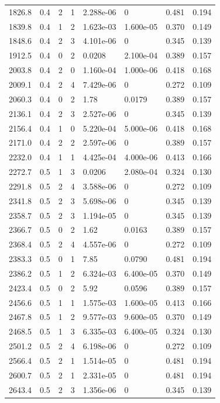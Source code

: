 \documentclass[preview]{standalone}
\begin{document}
{{{\begin{tabular}{L{1.2cm}C{1.2cm} C{0.3cm}C{0.5cm} C{1.4cm}C{1.4cm} C{1.4cm}C{1.4cm}}
  1826.8  &   0.4  & 2     &  1 &  2.288e-06  & 0  & 0.481 &  0.194   \\ 
  1839.8  &   0.4  & 1     &  2 &  1.623e-03  & 1.600e-05  & 0.370 &  0.149   \\ 
  1848.6  &   0.4  & 2     &  3 &  4.101e-06  & 0  & 0.345 &  0.139   \\ 
  1912.5  &   0.4  & 0     &  2 &  0.0208  & 2.100e-04  & 0.389 &  0.157   \\ 
  2003.8  &   0.4  & 2     &  0 &  1.160e-04  & 1.000e-06  & 0.418 &  0.168   \\ 
  2009.1  &   0.4  & 2     &  4 &  7.429e-06  & 0  & 0.272 &  0.109   \\ 
  2060.3  &   0.4  & 0     &  2 &  1.78  & 0.0179  & 0.389 &  0.157   \\ 
  2136.1  &   0.4  & 2     &  3 &  2.527e-06  & 0  & 0.345 &  0.139   \\ 
  2156.4  &   0.4  & 1     &  0 &  5.220e-04  & 5.000e-06  & 0.418 &  0.168   \\ 
  2171.0  &   0.4  & 2     &  2 &  2.597e-06  & 0  & 0.389 &  0.157   \\ 
  2232.0  &   0.4  & 1     &  1 &  4.425e-04  & 4.000e-06  & 0.413 &  0.166   \\ 
  2272.7  &   0.5  & 1     &  3 &  0.0206  & 2.080e-04  & 0.324 &  0.130   \\ 
  2291.8  &   0.5  & 2     &  4 &  3.588e-06  & 0  & 0.272 &  0.109   \\ 
  2341.8  &   0.5  & 2     &  3 &  5.698e-06  & 0  & 0.345 &  0.139   \\ 
  2358.7  &   0.5  & 2     &  3 &  1.194e-05  & 0  & 0.345 &  0.139   \\ 
  2366.7  &   0.5  & 0     &  2 &  1.62  & 0.0163  & 0.389 &  0.157   \\ 
  2368.4  &   0.5  & 2     &  4 &  4.557e-06  & 0  & 0.272 &  0.109   \\ 
  2383.3  &   0.5  & 0     &  1 &  7.85  & 0.0790  & 0.481 &  0.194   \\ 
  2386.2  &   0.5  & 1     &  2 &  6.324e-03  & 6.400e-05  & 0.370 &  0.149   \\ 
  2423.4  &   0.5  & 0     &  2 &  5.92  & 0.0596  & 0.389 &  0.157   \\ 
  2456.6  &   0.5  & 1     &  1 &  1.575e-03  & 1.600e-05  & 0.413 &  0.166   \\ 
  2467.8  &   0.5  & 1     &  2 &  9.577e-03  & 9.600e-05  & 0.370 &  0.149   \\ 
  2468.5  &   0.5  & 1     &  3 &  6.335e-03  & 6.400e-05  & 0.324 &  0.130   \\ 
  2501.2  &   0.5  & 2     &  4 &  6.198e-06  & 0  & 0.272 &  0.109   \\ 
  2566.4  &   0.5  & 2     &  1 &  1.514e-05  & 0  & 0.481 &  0.194   \\ 
  2600.7  &   0.5  & 2     &  1 &  2.331e-05  & 0  & 0.481 &  0.194   \\ 
  2643.4  &   0.5  & 2     &  3 &  1.356e-06  & 0  & 0.345 &  0.139   \\ 
\hline 
\end{tabular} 

}}}
\end{document}

